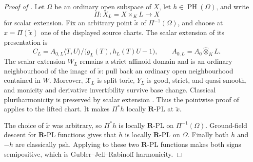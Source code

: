 \begin{proof}[Proof of
]
Let \(\Omega\) be an ordinary open subspace of \(X\), let
\(h\in\operatorname{PH}(\Omega)\), and write
\[
                     \Pi:X_L=X\times_KL\longrightarrow X
\]
for scalar extension.  Fix an arbitrary point \(\widetilde x\) of
\(\Pi^{-1}(\Omega)\), and choose at \(x=\Pi(\widetilde x)\) one of the
displayed source charts.  The scalar extension of its presentation is
\[
 C_L=A_{0,L}\langle T,U\rangle/
       \bigl(g_L(T),h_L(T)U-1\bigr),
 \qquad A_{0,L}=A_0\widehat\otimes_KL.
\]
The scalar extension \(W_L\) remains a strict affinoid domain and is an
ordinary neighbourhood of the image of \(\widetilde x\): pull back an
ordinary open neighbourhood contained in \(W\).  Moreover,
\(\mathcal X_L\) is split toric, \(Y_L\) is good, strict, and
quasi-smooth, and monicity and derivative invertibility survive base
change.  Classical pluriharmonicity is preserved by scalar extension
\cite[Proposition~7.2(6)]{GR25Classical}.  Thus the pointwise proof of
 applies to the lifted
chart.  It makes \(\Pi^*h\) locally \(\mathbf R\)-PL at
\(\widetilde x\).

The choice of \(\widetilde x\) was arbitrary, so \(\Pi^*h\) is locally
\(\mathbf R\)-PL on \(\Pi^{-1}(\Omega)\).  Ground-field descent for
\(\mathbf R\)-PL functions \cite[Corollary~5.12]{GJR26} gives that \(h\)
is locally \(\mathbf R\)-PL on \(\Omega\).  Finally both \(h\) and \(-h\)
are classically psh.  Applying \cite[Theorem~4.3]{GR25Classical} to these
two \(\mathbf R\)-PL functions makes both signs semipositive, which is
Gubler--Jell--Rabinoff harmonicity.
\end{proof}
